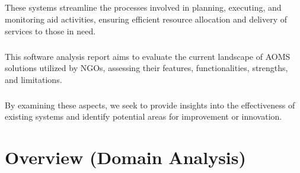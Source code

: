 \documentclass[a4paper,12pt]{report}
\begin{document}
	  	\paragraph{} These systems streamline the processes involved in planning, executing, and monitoring aid activities, ensuring efficient resource allocation and delivery of services to those in need.
   		\paragraph{} This software analysis report aims to evaluate the current landscape of AOMS solutions utilized by NGOs, assessing their features, functionalities, strengths, and limitations. 
     		\paragraph{} By examining these aspects, we seek to provide insights into the effectiveness of existing systems and identify potential areas for improvement or innovation.
    
	\chapter{Overview (Domain Analysis)}
 		
\end{document}
